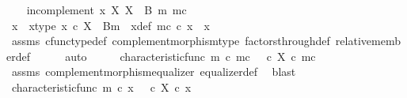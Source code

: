 \begin{isabellebody}
%
\isadelimproof
%
\endisadelimproof
%
\isatagproof
{}\isamarkupfalse%
\isanewline
\ \ \isamarkupfalse%
\ in{\isacharunderscore}{\kern0pt}complement{\isacharcolon}{\kern0pt}\ {\isachardoublequoteopen}x\ {\isasymin}\isactrlbsub X\isactrlesub \ {\isacharparenleft}{\kern0pt}X\ {\isasymsetminus}\ {\isacharparenleft}{\kern0pt}B{\isacharcomma}{\kern0pt}\ m{\isacharparenright}{\kern0pt}{\isacharcomma}{\kern0pt}\ m\isactrlsup c{\isacharparenright}{\kern0pt}{\isachardoublequoteclose}\isanewline
\ \ \isamarkupfalse%
\ \isamarkupfalse%
\ x{\isacharprime}{\kern0pt}\ \ x{\isacharprime}{\kern0pt}{\isacharunderscore}{\kern0pt}type{\isacharcolon}{\kern0pt}\ {\isachardoublequoteopen}x{\isacharprime}{\kern0pt}\ {\isasymin}\isactrlsub c\ X\ {\isasymsetminus}\ {\isacharparenleft}{\kern0pt}B{\isacharcomma}{\kern0pt}m{\isacharparenright}{\kern0pt}{\isachardoublequoteclose}\ \ x{\isacharprime}{\kern0pt}{\isacharunderscore}{\kern0pt}def{\isacharcolon}{\kern0pt}\ {\isachardoublequoteopen}m\isactrlsup c\ {\isasymcirc}\isactrlsub c\ x{\isacharprime}{\kern0pt}\ {\isacharequal}{\kern0pt}\ x{\isachardoublequoteclose}\isanewline
\ \ \ \ \isamarkupfalse%
\ assms\ cfunc{\isacharunderscore}{\kern0pt}type{\isacharunderscore}{\kern0pt}def\ complement{\isacharunderscore}{\kern0pt}morphism{\isacharunderscore}{\kern0pt}type\ factors{\isacharunderscore}{\kern0pt}through{\isacharunderscore}{\kern0pt}def\ relative{\isacharunderscore}{\kern0pt}member{\isacharunderscore}{\kern0pt}def{}\isanewline
\ \ \ \ \isamarkupfalse%
\ auto\isanewline
\ \ \isamarkupfalse%
\ \isamarkupfalse%
\ {\isachardoublequoteopen}characteristic{\isacharunderscore}{\kern0pt}func\ m\ {\isasymcirc}\isactrlsub c\ m\isactrlsup c\ {\isacharequal}{\kern0pt}\ {\isacharparenleft}{\kern0pt}{\isasymf}\ {\isasymcirc}\isactrlsub c\ {\isasymbeta}\isactrlbsub X\isactrlesub {\isacharparenright}{\kern0pt}\ {\isasymcirc}\isactrlsub c\ m\isactrlsup c{\isachardoublequoteclose}\isanewline
\ \ \ \ \isamarkupfalse%
\ assms\ complement{\isacharunderscore}{\kern0pt}morphism{\isacharunderscore}{\kern0pt}equalizer\ equalizer{\isacharunderscore}{\kern0pt}def\ \isamarkupfalse%
\ blast\isanewline
\ \ \isamarkupfalse%
\ \isamarkupfalse%
\ {\isachardoublequoteopen}characteristic{\isacharunderscore}{\kern0pt}func\ m\ {\isasymcirc}\isactrlsub c\ x\ {\isacharequal}{\kern0pt}\ {\isasymf}\ {\isasymcirc}\isactrlsub c\ {\isasymbeta}\isactrlbsub X\isactrlesub \ {\isasymcirc}\isactrlsub c\ x{\isachardoublequoteclose}\isanewline

\end{isabellebody}
